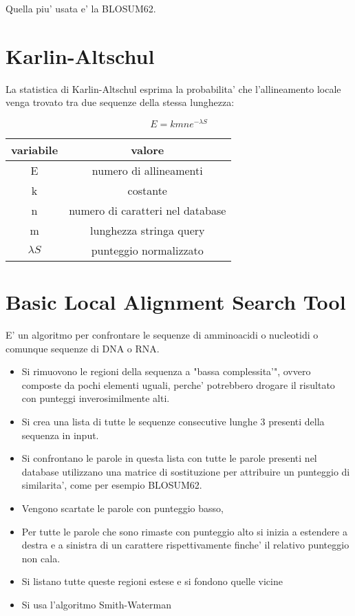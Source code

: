 Quella piu' usata e' la BLOSUM62.

\section{Karlin-Altschul}

La statistica di Karlin-Altschul esprima la probabilita' che l'allineamento locale venga trovato tra due sequenze della stessa lunghezza:

\[
    E = k m n e ^ {- \lambda S}
\]

\begin{center}
    \begin{tabular}{|| c | c ||}
        \hline
        variabile & valore \\ 
        \hline
        E & numero di allineamenti \\
        k & costante \\
        n & numero di caratteri nel database \\
        m & lunghezza stringa query \\
        $\lambda S$ & punteggio normalizzato \\
        \hline
    \end{tabular}
\end{center}

\section{Basic Local Alignment Search Tool}

E' un algoritmo per confrontare le sequenze di amminoacidi o nucleotidi o comunque sequenze di DNA o RNA.

\begin{itemize}
    \item Si rimuovono le regioni della sequenza a "bassa complessita'", ovvero composte da pochi elementi uguali, perche' potrebbero drogare il risultato con punteggi inverosimilmente alti.
    \item Si crea una lista di tutte le sequenze consecutive lunghe 3 presenti della sequenza in input.
    \item Si confrontano le parole in questa lista con tutte le parole presenti nel database utilizzano una matrice di sostituzione per attribuire un punteggio di similarita', come per esempio BLOSUM62.
    \item Vengono scartate le parole con punteggio basso,
    \item Per tutte le parole che sono rimaste con punteggio alto si inizia a estendere a destra e a sinistra di un carattere rispettivamente finche' il relativo punteggio non cala.
    \item Si listano tutte queste regioni estese e si fondono quelle vicine
    \item Si usa l'algoritmo Smith-Waterman
\end{itemize}
